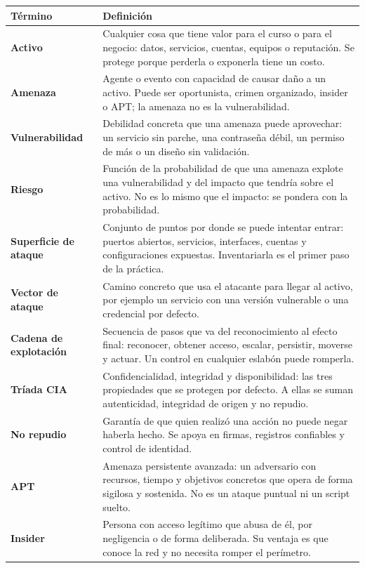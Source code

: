 \documentclass[11pt,a4paper]{article}
\begin{document}
\small
\begin{longtable}{@{}>{\raggedright\arraybackslash}p{4.2cm}>{\raggedright\arraybackslash}p{\dimexpr\linewidth-4.2cm-12pt\relax}@{}}
\toprule
\textbf{Término} & \textbf{Definición}\\
\midrule
\endhead
\bottomrule
\endlastfoot
\textbf{Activo} & Cualquier cosa que tiene valor para el curso o para el negocio: datos, servicios, cuentas, equipos o reputación. Se protege porque perderla o exponerla tiene un costo.\\
\textbf{Amenaza} & Agente o evento con capacidad de causar daño a un activo. Puede ser oportunista, crimen organizado, insider o APT; la amenaza no es la vulnerabilidad.\\
\textbf{Vulnerabilidad} & Debilidad concreta que una amenaza puede aprovechar: un servicio sin parche, una contraseña débil, un permiso de más o un diseño sin validación.\\
\textbf{Riesgo} & Función de la probabilidad de que una amenaza explote una vulnerabilidad y del impacto que tendría sobre el activo. No es lo mismo que el impacto: se pondera con la probabilidad.\\
\textbf{Superficie de ataque} & Conjunto de puntos por donde se puede intentar entrar: puertos abiertos, servicios, interfaces, cuentas y configuraciones expuestas. Inventariarla es el primer paso de la práctica.\\
\textbf{Vector de ataque} & Camino concreto que usa el atacante para llegar al activo, por ejemplo un servicio con una versión vulnerable o una credencial por defecto.\\
\textbf{Cadena de explotación} & Secuencia de pasos que va del reconocimiento al efecto final: reconocer, obtener acceso, escalar, persistir, moverse y actuar. Un control en cualquier eslabón puede romperla.\\
\textbf{Tríada CIA} & Confidencialidad, integridad y disponibilidad: las tres propiedades que se protegen por defecto. A ellas se suman autenticidad, integridad de origen y no repudio.\\
\textbf{No repudio} & Garantía de que quien realizó una acción no puede negar haberla hecho. Se apoya en firmas, registros confiables y control de identidad.\\
\textbf{APT} & Amenaza persistente avanzada: un adversario con recursos, tiempo y objetivos concretos que opera de forma sigilosa y sostenida. No es un ataque puntual ni un script suelto.\\
\textbf{Insider} & Persona con acceso legítimo que abusa de él, por negligencia o de forma deliberada. Su ventaja es que conoce la red y no necesita romper el perímetro.\\

\end{longtable}
\end{document}
